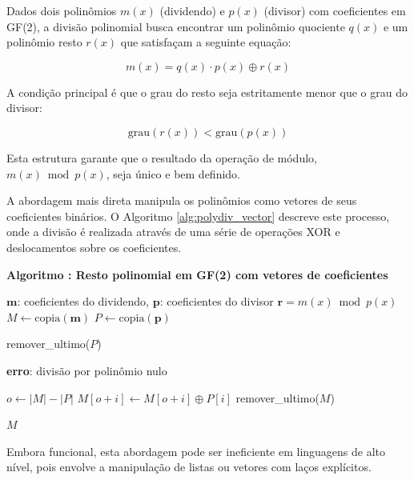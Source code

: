 Dados dois polinômios $m(x)$ (dividendo) e $p(x)$ (divisor) com coeficientes em GF(2), a divisão polinomial busca encontrar um polinômio quociente $q(x)$ e um polinômio resto $r(x)$ que satisfaçam a seguinte equação:

\begin{equation}
m(x) = q(x) \cdot p(x) \oplus r(x)
\end{equation}

A condição principal é que o grau do resto seja estritamente menor que o grau do divisor:

\begin{equation}
\text{grau}(r(x)) < \text{grau}(p(x))
\end{equation}

Esta estrutura garante que o resultado da operação de módulo, $m(x) \bmod p(x)$, seja único e bem definido.

A abordagem mais direta manipula os polinômios como vetores de seus coeficientes binários. O Algoritmo \ref{alg:polydiv_vector} descreve este processo, onde a divisão é realizada através de uma série de operações XOR e deslocamentos sobre os coeficientes.

\begin{algorithm}[H]
\textbf{Algoritmo \thealgorithm: Resto polinomial em GF(2) com vetores de coeficientes}\label{alg:polydiv_vector}\par\smallskip
\begin{algorithmic}[1]
\Require $\mathbf{m}$: coeficientes do dividendo, $\mathbf{p}$: coeficientes do divisor
\Ensure $\mathbf{r} = m(x) \bmod p(x)$
\State $M \gets \text{copia}(\mathbf{m})$
\State $P \gets \text{copia}(\mathbf{p})$

    \State remover\_ultimo($P$)
\EndWhile

    \State \textbf{erro}: divisão por polinômio nulo
\EndIf

        \State $o \gets |M| - |P|$ 
            \State $M[o+i] \gets M[o+i] \oplus P[i]$
        \EndFor
    \EndIf
    \State remover\_ultimo($M$)
\EndWhile

\State \Return $M$
\end{algorithmic}
\end{algorithm}

Embora funcional, esta abordagem pode ser ineficiente em linguagens de alto nível, pois envolve a manipulação de listas ou vetores com laços explícitos.

